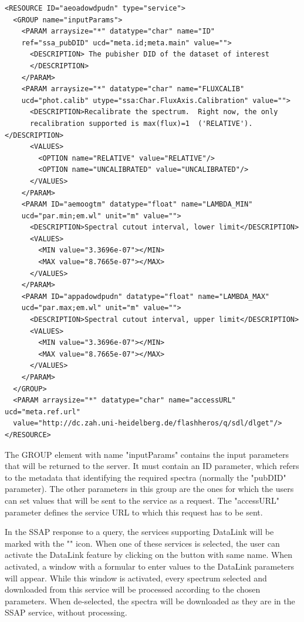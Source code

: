 \documentclass[final,authoryear,5p,times,twocolumn]{elsarticle}
\begin{document}
{\tiny
\begin{minipage}{\textwidth}
\begin{verbatim}
<RESOURCE ID="aeoadowdpudn" type="service">
  <GROUP name="inputParams">
    <PARAM arraysize="*" datatype="char" name="ID"
    ref="ssa_pubDID" ucd="meta.id;meta.main" value="">
      <DESCRIPTION> The pubisher DID of the dataset of interest
      </DESCRIPTION>
    </PARAM>
    <PARAM arraysize="*" datatype="char" name="FLUXCALIB"
    ucd="phot.calib" utype="ssa:Char.FluxAxis.Calibration" value="">
      <DESCRIPTION>Recalibrate the spectrum.  Right now, the only
      recalibration supported is max(flux)=1  ('RELATIVE').</DESCRIPTION>
      <VALUES>
        <OPTION name="RELATIVE" value="RELATIVE"/>
        <OPTION name="UNCALIBRATED" value="UNCALIBRATED"/>
      </VALUES>
    </PARAM>
    <PARAM ID="aemoogtm" datatype="float" name="LAMBDA_MIN"
    ucd="par.min;em.wl" unit="m" value="">
      <DESCRIPTION>Spectral cutout interval, lower limit</DESCRIPTION>
      <VALUES>
        <MIN value="3.3696e-07"></MIN>
        <MAX value="8.7665e-07"></MAX>
      </VALUES>
    </PARAM>
    <PARAM ID="appadowdpudn" datatype="float" name="LAMBDA_MAX"
    ucd="par.max;em.wl" unit="m" value="">
      <DESCRIPTION>Spectral cutout interval, upper limit</DESCRIPTION>
      <VALUES>
        <MIN value="3.3696e-07"></MIN>
        <MAX value="8.7665e-07"></MAX>
      </VALUES>
    </PARAM>
  </GROUP>
  <PARAM arraysize="*" datatype="char" name="accessURL" ucd="meta.ref.url"
  value="http://dc.zah.uni-heidelberg.de/flashheros/q/sdl/dlget"/>
</RESOURCE>
\end{verbatim}

\end{minipage}
}

The GROUP element with name "inputParams" contains the input
parameters that will be returned to the server.  It must contain an ID
parameter, which refers to the metadata that identifying the required
spectra (normally the "pubDID" parameter).  The other parameters in
this group are the ones for which the users can set values that will
be sent to the service as a request. The "accessURL" parameter defines
the service URL to which this request has to be sent.

In the SSAP response to a query, the services supporting DataLink will
be marked with the  ""  icon. When one of these services is
selected, the user can activate the DataLink feature by clicking on
the button with same name. When activated, a window with a formular to
enter values to the DataLink parameters will appear. While this window
is activated, every spectrum selected and downloaded from this service
will be processed according to the chosen parameters. When
de-selected, the spectra will be downloaded as they are in the SSAP
service, without processing.
\end{document}
